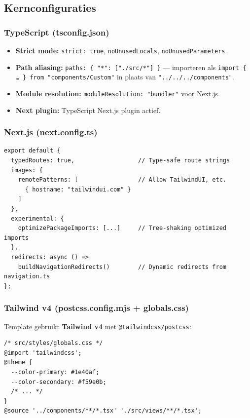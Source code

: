 \subsection{Kernconfiguraties}

\subsubsection{TypeScript (tsconfig.json)}

\begin{itemize}
  \item \textbf{Strict mode:} \texttt{strict: true}, \texttt{noUnusedLocals}, \texttt{noUnusedParameters}.
  \item \textbf{Path aliasing:} \texttt{paths: \{ "*": ["./src/*"] \}} — importeren als \texttt{import \{ … \} from "components/Custom"} in plaats van \texttt{"../../../components"}.
  \item \textbf{Module resolution:} \texttt{moduleResolution: "bundler"} voor Next.js.
  \item \textbf{Next plugin:} TypeScript Next.js plugin actief.
\end{itemize}

\subsubsection{Next.js (next.config.ts)}

\begin{verbatim}
export default {
  typedRoutes: true,                  // Type-safe route strings
  images: {
    remotePatterns: [                 // Allow TailwindUI, etc.
      { hostname: "tailwindui.com" }
    ]
  },
  experimental: {
    optimizePackageImports: [...]     // Tree-shaking optimized imports
  },
  redirects: async () =>
    buildNavigationRedirects()        // Dynamic redirects from navigation.ts
};
\end{verbatim}

\subsubsection{Tailwind v4 (postcss.config.mjs + globals.css)}

Template gebruikt \textbf{Tailwind v4} met \texttt{@tailwindcss/postcss}:

\begin{verbatim}
/* src/styles/globals.css */
@import 'tailwindcss';
@theme {
  --color-primary: #1e40af;
  --color-secondary: #f59e0b;
  /* ... */
}
@source '../components/**/*.tsx' './src/views/**/*.tsx';
\end{verbatim}

